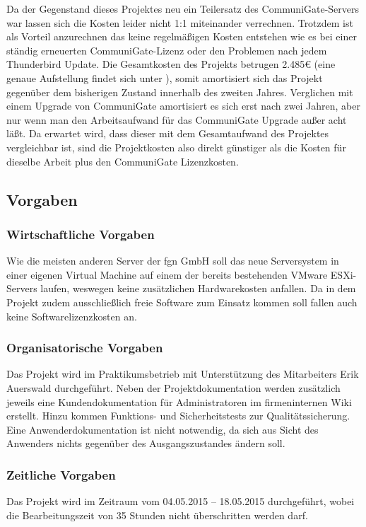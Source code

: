 \documentclass[11pt,a4paper,titlepage=firstiscover,headsepline,bibtotoc]{scrartcl} %
\begin{document}
Da der Gegenstand dieses Projektes neu ein Teilersatz des CommuniGate-Servers war lassen sich die Kosten leider nicht 1:1 miteinander verrechnen. Trotzdem ist als Vorteil anzurechnen das keine regelmäßigen Kosten entstehen wie es bei einer ständig erneuerten CommuniGate-Lizenz oder den Problemen nach jedem Thunderbird Update. Die Gesamtkosten des Projekts betrugen 2.485\euro{} (eine genaue Aufstellung findet sich unter ), somit amortisiert sich das Projekt gegenüber dem bisherigen Zustand innerhalb des zweiten Jahres. Verglichen mit einem Upgrade von CommuniGate amortisiert es sich erst nach zwei Jahren, aber nur wenn man den Arbeitsaufwand für das CommuniGate Upgrade außer acht läßt. Da erwartet wird, dass dieser mit dem Gesamtaufwand des Projektes vergleichbar ist, sind die Projektkosten also direkt günstiger als die Kosten für dieselbe Arbeit plus den CommuniGate Lizenzkosten.

\subsection{Vorgaben}
\subsubsection{Wirtschaftliche Vorgaben}
Wie die meisten anderen Server der fgn GmbH soll das neue Serversystem in einer eigenen Virtual Machine auf einem der bereits bestehenden VMware ESXi-Servers laufen, weswegen keine zusätzlichen Hardwarekosten anfallen. Da in dem Projekt zudem ausschließlich freie Software zum Einsatz kommen soll fallen auch keine Softwarelizenzkosten an.

\subsubsection{Organisatorische Vorgaben}
Das Projekt wird im Praktikumsbetrieb mit Unterstützung des Mitarbeiters Erik Auerswald durchgeführt.
Neben der Projektdokumentation werden zusätzlich jeweils eine Kundendokumentation für Administratoren im firmeninternen Wiki erstellt. Hinzu kommen Funktions- und Sicherheitstests zur Qualitätssicherung. Eine Anwenderdokumentation ist nicht notwendig, da sich aus Sicht des Anwenders nichts gegenüber des Ausgangszustandes ändern soll.

\subsubsection{Zeitliche Vorgaben}
Das Projekt wird im Zeitraum vom 04.05.2015 – 18.05.2015 durchgeführt, wobei die Bearbeitungszeit von 35 Stunden nicht überschritten werden darf.
\end{document}
